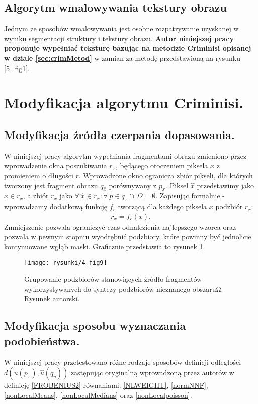 \documentclass[12pt, twoside, openany]{report}
\theoremstyle{definition}
\begin{document}
\subsection{Algorytm wmalowywania tekstury obrazu}
Jednym ze sposobów wmalowywania jest osobne rozpatrywanie uzyskanej w wyniku segmentacji struktury i tekstury obrazu. \textbf{Autor niniejszej pracy proponuje wypełniać teksturę bazując na metodzie Criminisi opisanej w dziale \ref{sec:crimMetod}} w zamian za metodę przedstawioną na rysunku \ref{5_fig1}.
\section{Modyfikacja algorytmu Criminisi.}
\label{ssec:crimMod}
\subsection{Modyfikacja źródła czerpania dopasowania.}
\label{ssec:crimModSource}
W niniejszej pracy algorytm wypełniania fragmentami obrazu zmieniono przez wprowadzenie okna poszukiwania $r_x$, będącego otoczeniem piksela $x$ z promieniem o długości $r$. Wprowadzone okno ogranicza zbiór pikseli, dla których tworzony jest fragment obrazu $q_{\hat{x}}$ porównywany z $p_{x}$.
Piksel $\hat{x}$ przedstawimy jako $\hat{x} \in r_x$, a zbiór $r_x$ jako 
$\forall \ \hat{x} \in r_x: \forall \ p \in q_{\hat{x}} \cap \ \Omega = \emptyset$. Zapisując formalnie - wprowadzamy dodatkową funkcję $f_r$ tworzącą dla każdego piksela $x$ podzbiór $r_x$:
\begin{align}
r_x = f_r(x).
\end{align}
Zmniejszenie pozwala ograniczyć czas odnalezienia najlepszego wzorca oraz pozwala w pewnym stopniu wyodrębnić podzbiory, które powinny być jednolicie kontynuowane wgłąb maski. Graficznie przedstawia to rysunek \ref{4_fig9}.
\begin{figure}[!h]
	\centering
	\texttt{[image: rysunki/4\_fig9]}
	\caption{Grupowanie podzbiorów stanowiących źródło fragmentów wykorzystywanych do syntezy podzbiorów nieznanego obszaru$\boldsymbol{\mathrm{\Omega }}$. Rysunek autorski.}
\label{4_fig9}
\end{figure}
\subsection{Modyfikacja sposobu wyznaczania podobieństwa.}
\label{ssec:modDistForCrim}
W niniejszej pracy przetestowano różne rodzaje sposobów definicji odległości $d\left( u(p_x), \hat{u} (q_{\hat{y}}) \right)$  zastępując oryginalną wprowadzoną przez autorów w \cite{criminisi2004region} definicję \eqref{FROBENIUS2} równaniami: \eqref{NLWEIGHT}, \eqref{normNNF}, \eqref{nonLocalMeans}, \eqref{nonLocalMedians} oraz \eqref{nonLocalpoisson}.
\end{document}

